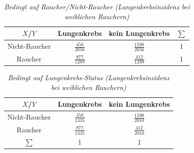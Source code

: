 \documentclass[a4paper]{article}
\begin{document}
\noindent {}

\clearpage

\begin{table}[htbp]
\begin{tabular}{c|cc|c}
    $X$/$Y$         & Lungenkrebs & kein Lungenkrebs & $\sum$ \\
     \hline
    Nicht-Raucher   & $\frac{458}{2056}$         & $\frac{1598}{2056}$             & 1 \\
    Raucher         & $\frac{877}{1289}$         & $\frac{412}{1289}$              & 1 \\
    \hline
\end{tabular}
    \caption{\textit{Bedingt auf Raucher/Nicht-Raucher (Lungenkrebsinzidenz bei weiblichen Rauchern)}}
    \label{tab:bed1}
\end{table}

\begin{table}[htbp!]
\begin{tabular}{c|cc|}
    $X$/$Y$         & Lungenkrebs & kein Lungenkrebs \\
     \hline
    Nicht-Raucher   & $\frac{458}{1335}$         & $\frac{1598}{2010}$   \\      
    Raucher         & $\frac{877}{1335}$         & $\frac{412}{2010}$    \\      
    \hline
    $\sum$          & 1         & 1           
\end{tabular}
    \caption{\textit{Bedingt auf Lungenkrebs-Status (Lungenkrebsinzidenz bei weiblichen Rauchern)}}
    \label{tab:bed2}
\end{table}

\noindent {}
\end{document}
